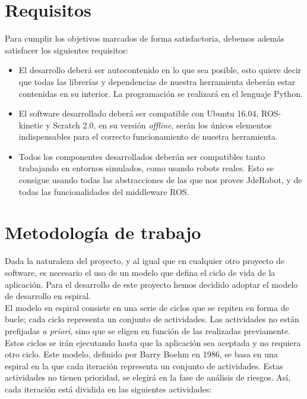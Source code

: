 \section{Requisitos}
\label{sec:requisitos}

Para cumplir los objetivos marcados de forma satisfactoria, debemos además satisfacer
 los siguientes requisitos:

\begin{itemize}
\item El desarrollo deberá ser autocontenido en lo que sea posible, esto quiere decir que todas las librerías y dependencias de nuestra herramienta deberán estar contenidas en su interior. La programación se realizará en el
 lenguaje Python.
\item El software desarrollado deberá ser compatible con Ubuntu 16.04, ROS-kinetic y Scratch 2.0, en su versión \textit{offline}, serán los únicos elementos indispensables para el correcto funcionamiento de nuestra herramienta.
\item Todos los componentes desarrollados deberán ser compatibles tanto trabajando en entornos simulados, como usando robots reales. Esto se consigue usando todas las abstracciones de las que nos provee JdeRobot, y de todas las funcionalidades del middleware ROS.
\end{itemize}



\section{Metodología de trabajo}
\label{sec:metodologia}

Dada la naturaleza del proyecto, y al igual que en cualquier otro proyecto de software, es necesario el uso de un modelo que defina el ciclo de vida de la aplicación. Para el desarrollo de este proyecto hemos decidido adoptar el modelo de desarrollo en espiral.\\

El modelo en espiral consiste en una serie de ciclos que se repiten en forma de
 bucle; cada ciclo representa un conjunto de actividades. Las actividades no están 
prefijadas \textit{a priori}, sino que se eligen en función de las realizadas previamente. Estos ciclos se irán ejecutando hasta que la aplicación sea aceptada y no requiera otro 
ciclo. Este modelo, definido por Barry Boehm en 1986, se basa en una espiral en la que cada iteración representa un conjunto de actividades. Estas actividades no tienen prioridad, se elegirá en la fase de análisis de riesgos. Así, cada iteración está dividida en las siguientes actividades:

